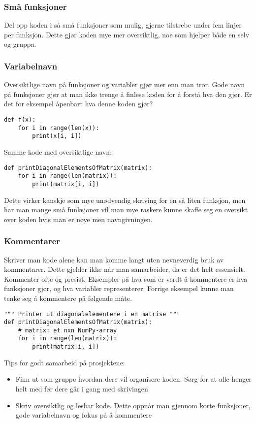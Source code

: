 \documentclass[a4paper,12pt]{article}
\begin{document}
\subsubsection{Små funksjoner}
Del opp koden i så små funksjoner som mulig, gjerne tilstrebe under fem linjer per funksjon.
Dette gjør koden mye mer oversiktlig, noe som hjelper både en selv og gruppa.

\subsubsection{Variabelnavn}
Oversiktlige navn på funksjoner og variabler gjør mer enn man tror. Gode navn på funksjoner gjør at man ikke trenge å finlese koden for å forstå hva den gjør. Er det for eksempel åpenbart hva denne koden gjør? 

\begin{lstlisting}
def f(x):
    for i in range(len(x)):
        print(x[i, i])
\end{lstlisting}

Samme kode med oversiktlige navn:

\begin{lstlisting}
def printDiagonalElementsOfMatrix(matrix):
    for i in range(len(matrix)):
        print(matrix[i, i])
\end{lstlisting}

Dette virker kanskje som mye unødvendig skriving for en så liten funksjon, men har man mange små funksjoner vil man mye raskere kunne skaffe seg en oversikt over koden hvis man er nøye men navngivningen.

\subsubsection{Kommentarer}
Skriver man kode alene kan man komme langt uten nevneverdig bruk av kommentarer. Dette gjelder ikke når man samarbeider, da er det helt essensielt. Kommenter ofte og presist. Eksempler på hva som er verdt å kommentere er hva funksjoner gjør, og hva variabler representerer. Forrige eksempel kunne man tenke seg å kommentere på følgende måte.

\begin{lstlisting}
""" Printer ut diagonalelementene i en matrise """
def printDiagonalElementsOfMatrix(matrix):
    # matrix: et nxn NumPy-array
    for i in range(len(matrix)):
        print(matrix[i, i])
\end{lstlisting}

\begin{mdframed}[frametitle={Oppsummert}]
Tips for godt samarbeid på prosjektene:
\begin{itemize}
    \item Finn ut som gruppe hvordan dere vil organisere koden. Sørg for at alle henger helt med før dere går i gang med skrivingen
    
    \item Skriv oversiktlig og lesbar kode. Dette oppnår man gjennom korte funksjoner, gode variabelnavn og fokus på å kommentere
\end{itemize}
\end{mdframed}
\end{document}

